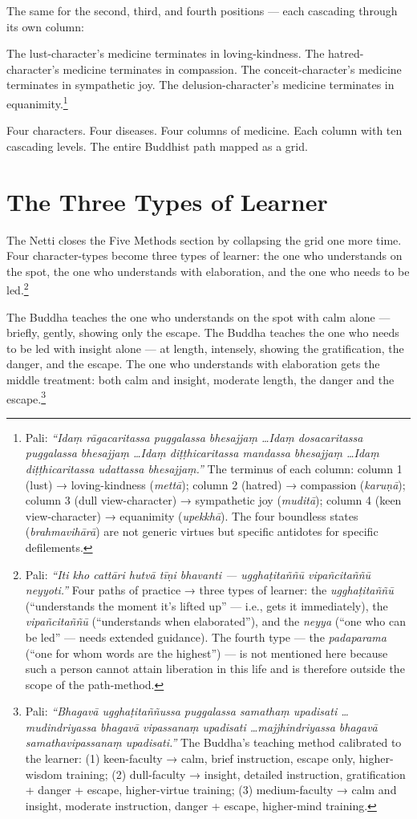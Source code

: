 The same for the second, third, and fourth positions --- each cascading through its own column:

The lust-character's medicine terminates in loving-kindness. The hatred-character's medicine terminates in compassion. The conceit-character's medicine terminates in sympathetic joy. The delusion-character's medicine terminates in equanimity.\footnote{Pali: \textit{``Idaṃ rāgacaritassa puggalassa bhesajjaṃ \ldots Idaṃ dosacaritassa puggalassa bhesajjaṃ \ldots Idaṃ diṭṭhicaritassa mandassa bhesajjaṃ \ldots Idaṃ diṭṭhicaritassa udattassa bhesajjaṃ.''} The terminus of each column: column 1 (lust) → loving-kindness (\textit{mettā}); column 2 (hatred) → compassion (\textit{karuṇā}); column 3 (dull view-character) → sympathetic joy (\textit{muditā}); column 4 (keen view-character) → equanimity (\textit{upekkhā}). The four boundless states (\textit{brahmavihārā}) are not generic virtues but specific antidotes for specific defilements.}

Four characters. Four diseases. Four columns of medicine. Each column with ten cascading levels. The entire Buddhist path mapped as a grid.

\section*{The Three Types of Learner}

The Netti closes the Five Methods section by collapsing the grid one more time. Four character-types become three types of learner: the one who understands on the spot, the one who understands with elaboration, and the one who needs to be led.\footnote{Pali: \textit{``Iti kho cattāri hutvā tīṇi bhavanti --- ugghaṭitaññū vipañcitaññū neyyoti.''} Four paths of practice → three types of learner: the \textit{ugghaṭitaññū} (``understands the moment it's lifted up'' --- i.e., gets it immediately), the \textit{vipañcitaññū} (``understands when elaborated''), and the \textit{neyya} (``one who can be led'' --- needs extended guidance). The fourth type --- the \textit{padaparama} (``one for whom words are the highest'') --- is not mentioned here because such a person cannot attain liberation in this life and is therefore outside the scope of the path-method.}

The Buddha teaches the one who understands on the spot with calm alone --- briefly, gently, showing only the escape. The Buddha teaches the one who needs to be led with insight alone --- at length, intensely, showing the gratification, the danger, and the escape. The one who understands with elaboration gets the middle treatment: both calm and insight, moderate length, the danger and the escape.\footnote{Pali: \textit{``Bhagavā ugghaṭitaññussa puggalassa samathaṃ upadisati \ldots mudindriyassa bhagavā vipassanaṃ upadisati \ldots majjhindriyassa bhagavā samathavipassanaṃ upadisati.''} The Buddha's teaching method calibrated to the learner: (1) keen-faculty → calm, brief instruction, escape only, higher-wisdom training; (2) dull-faculty → insight, detailed instruction, gratification + danger + escape, higher-virtue training; (3) medium-faculty → calm and insight, moderate instruction, danger + escape, higher-mind training.}

